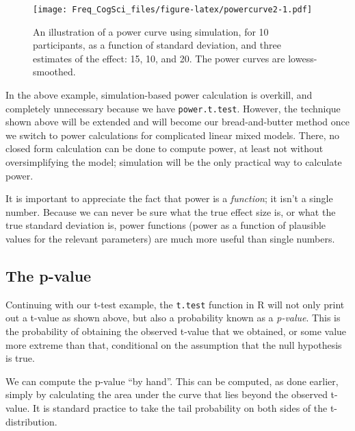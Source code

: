 \documentclass[12pt,]{krantz}
\newenvironment{Shaded}{\begin{snugshade}}{\end{snugshade}}
\newcommand{\DataTypeTok}[1]{\textcolor[rgb]{0.13,0.29,0.53}{#1}}
\newcommand{\DecValTok}[1]{\textcolor[rgb]{0.00,0.00,0.81}{#1}}
\newcommand{\KeywordTok}[1]{\textcolor[rgb]{0.13,0.29,0.53}{\textbf{#1}}}
\newcommand{\NormalTok}[1]{#1}
\newcommand{\OperatorTok}[1]{\textcolor[rgb]{0.81,0.36,0.00}{\textbf{#1}}}
\begin{document}
\begin{figure}
\centering
\texttt{[image: Freq\_CogSci\_files/figure-latex/powercurve2-1.pdf]}
\caption{\label{fig:powercurve2}An illustration of a power curve using simulation, for 10 participants, as a function of standard deviation, and three estimates of the effect: 15, 10, and 20. The power curves are lowess-smoothed.}
\end{figure}

In the above example, simulation-based power calculation is overkill, and completely unnecessary because we have \texttt{power.t.test}. However, the technique shown above will be extended and will become our bread-and-butter method once we switch to power calculations for complicated linear mixed models. There, no closed form calculation can be done to compute power, at least not without oversimplifying the model; simulation will be the only practical way to calculate power.

It is important to appreciate the fact that power is a \emph{function}; it isn't a single number. Because we can never be sure what the true effect size is, or what the true standard deviation is, power functions (power as a function of plausible values for the relevant parameters) are much more useful than single numbers.

\hypertarget{the-p-value}{%
\subsection{The p-value}\label{the-p-value}}

Continuing with our t-test example, the \texttt{t.test} function in R will not only print out a t-value as shown above, but also a probability known as a \emph{p-value}. This is the probability of obtaining the observed t-value that we obtained, or some value more extreme than that, conditional on the assumption that the null hypothesis is true.

We can compute the p-value ``by hand''. This can be computed, as done earlier, simply by calculating the area under the curve that lies beyond the observed t-value. It is standard practice to take the tail probability on both sides of the t-distribution.

\begin{Shaded}
\end{Shaded}
\end{document}
